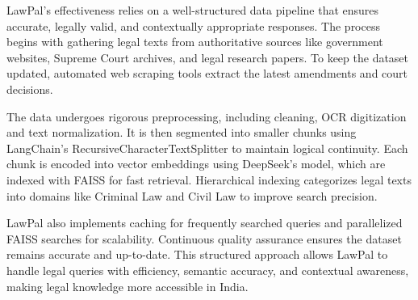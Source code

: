 LawPal’s effectiveness relies on a well-structured data pipeline that ensures accurate, legally valid, and contextually appropriate responses. The process begins with gathering legal texts from authoritative sources like government websites, Supreme Court archives, and legal research papers. To keep the dataset updated, automated web scraping tools extract the latest amendments and court decisions.

The data undergoes rigorous preprocessing, including cleaning, OCR digitization and text normalization. It is then segmented into smaller chunks using LangChain’s RecursiveCharacterTextSplitter to maintain logical continuity. Each chunk is encoded into vector embeddings using DeepSeek’s model\cite{liu2024deepseek}, which are indexed with FAISS\cite{douze2024faiss} for fast retrieval. Hierarchical indexing categorizes legal texts into domains like Criminal Law and Civil Law to improve search precision.

LawPal also implements caching for frequently searched queries and parallelized FAISS searches for scalability. Continuous quality assurance ensures the dataset remains accurate and up-to-date. This structured approach allows LawPal to handle legal queries with efficiency, semantic accuracy, and contextual awareness, making legal knowledge more accessible in India.